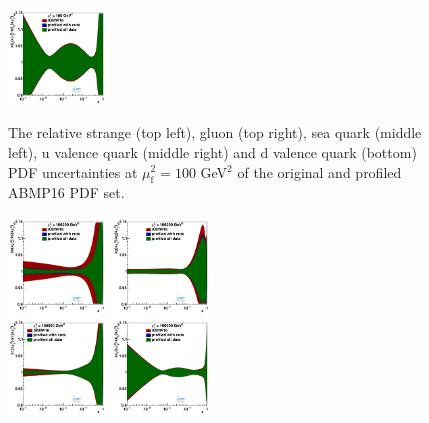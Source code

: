 \documentclass[pdftex,twocolumn,epjc3]{svjour3}          %
\newcommand{\abmp} {ABMP16\xspace}
\begin{document}
{\begin{figure}
  {{\includegraphics[width=0.235\textwidth]{pics/pdf-profile-ffabm/q2_100_pdf_dv_ratio.pdf}}}
  \caption{The relative strange (top left), gluon (top right), sea
    quark (middle left), u valence quark (middle right) and d valence
    quark (bottom) PDF uncertainties at $\mu_\mathrm{f}^2=100$ GeV$^2$
    of the original and profiled \abmp PDF set.}
  \label{fig:pdf-abmp}
\end{figure}

\begin{figure}
  \centering
  {{\includegraphics[width=0.235\textwidth]{pics/pdf-profile-ffabm/q2_100000_pdf_sq_ratio.pdf}}}
  {{\includegraphics[width=0.235\textwidth]{pics/pdf-profile-ffabm/q2_100000_pdf_g_ratio.pdf}}}\\
  {{\includegraphics[width=0.235\textwidth]{pics/pdf-profile-ffabm/q2_100000_pdf_Sea_ratio.pdf}}}
  {{\includegraphics[width=0.235\textwidth]{pics/pdf-profile-ffabm/q2_100000_pdf_uv_ratio.pdf}}}

\end{figure}}
\end{document}
